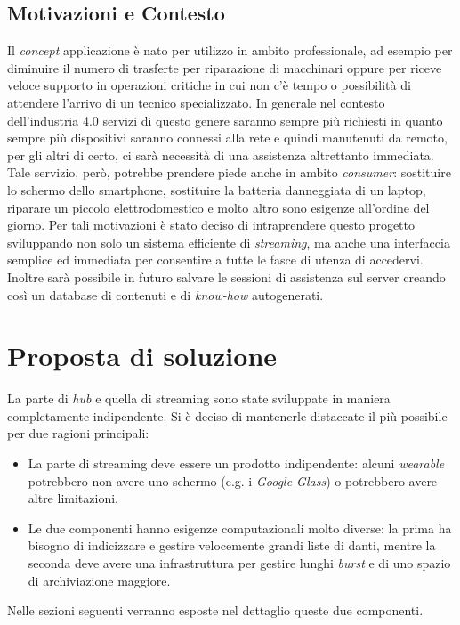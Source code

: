 \documentclass[conference]{IEEEtran}
\begin{document}
	\subsection{Motivazioni e Contesto}
		Il \textit{concept} applicazione è nato per utilizzo in ambito professionale,
		ad esempio per diminuire il numero di trasferte per riparazione di macchinari oppure per 
		riceve veloce supporto in operazioni critiche in cui non c'è tempo o possibilità di attendere
		l'arrivo di un tecnico specializzato. In generale nel contesto dell'industria 4.0 servizi di questo
		genere saranno sempre più richiesti in quanto sempre più dispositivi saranno connessi alla rete
		e quindi manutenuti da remoto, per gli altri di certo, ci sarà necessità di una assistenza altrettanto
		immediata.\\
		Tale servizio, però, potrebbe prendere piede anche in ambito \textit{consumer}: sostituire lo schermo dello smartphone, 
		sostituire la batteria danneggiata di un laptop, riparare un piccolo elettrodomestico e molto altro
		sono esigenze all'ordine del giorno.
		Per tali motivazioni è stato deciso di intraprendere questo progetto sviluppando non solo un sistema
		efficiente di \textit{streaming}, ma anche una interfaccia semplice ed immediata per consentire a tutte
		le fasce di utenza di accedervi. Inoltre sarà possibile in futuro salvare le sessioni di assistenza sul 
		server creando così un database di contenuti e di \textit{know-how} autogenerati.
				





 
\section{Proposta di soluzione}
	La parte di \textit{hub} e quella di streaming sono state sviluppate in maniera completamente indipendente.
	Si è deciso di mantenerle distaccate il più possibile per due ragioni principali:
	\begin{itemize}
		\item La parte di streaming deve essere un prodotto indipendente: alcuni \textit{wearable} potrebbero
		non avere uno schermo (e.g. i \textit{Google Glass}) o potrebbero avere altre limitazioni.
		\item Le due componenti hanno esigenze computazionali molto diverse: la prima ha bisogno di indicizzare e gestire velocemente
		grandi liste di danti, mentre la seconda deve avere una infrastruttura per gestire lunghi \textit{burst} e di uno spazio
		di archiviazione maggiore.
	\end{itemize}
	Nelle sezioni seguenti verranno esposte nel dettaglio queste due componenti.
\end{document}
